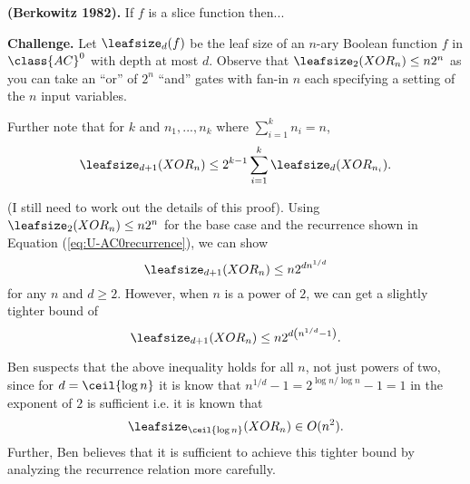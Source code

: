 \begin{theorem}
	\textbf{(Berkowitz 1982).} If $f$ is a slice function then...
\end{theorem}

\textbf{Challenge.} Let $\leafsize_{d}(f)$ be the leaf size of an $n$-ary Boolean function $f$ in $\class{AC}^0$ with depth at most $d$. Observe that $\leafsize_2(XOR_n) \leq n2^n$ as you can take an ``or'' of $2^n$ ``and'' gates with fan-in $n$ each specifying a setting of the $n$ input variables.

Further note that for $k$ and $n_1, ..., n_k$ where $\sum_{i = 1}^{k} n_i = n$, 
\begin{equation}
	\label{eq:U-AC0recurrence}
	\leafsize_{d+1}(XOR_n) \leq 2^{k-1}\sum_{i = 1}^{k}\leafsize_{d}(XOR_{n_i}).
\end{equation}

(I still need to work out the details of this proof). Using $\leafsize_2(XOR_n) \leq n2^n$ for the base case and the recurrence shown in Equation (\ref{eq:U-AC0recurrence}), we can show 
\[\leafsize_{d+1}(XOR_n) \leq n2^{dn^{1/d}}\]
for any $n$ and $d \geq 2$. However, when $n$ is a power of $2$, we can get a slightly tighter bound of 
\[\leafsize_{d+1}(XOR_n) \leq n2^{d\left(n^{1/d} - 1\right)}.\]

Ben suspects that the above inequality holds for all $n$, not just powers of two, since for $d = \ceil{\log n}$ it is know that $n^{1/d} - 1 = 2^{\log n/ \log n} - 1 = 1$ in the exponent of $2$ is sufficient i.e. it is known that
\[\leafsize_{\ceil{\log n}}(XOR_n) \in O(n^2).\]
Further, Ben believes that it is sufficient to achieve this tighter bound by analyzing the recurrence relation more carefully. 
